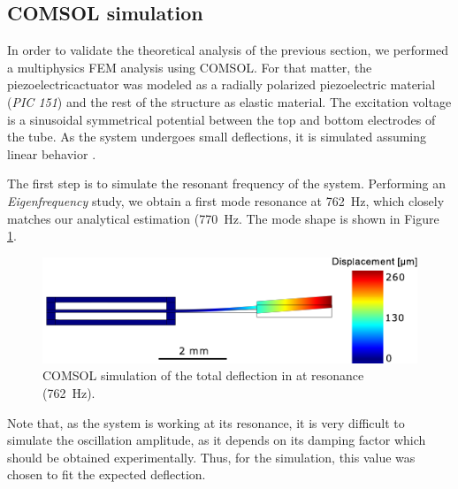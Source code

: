 \subsection{COMSOL simulation}
In order to validate the theoretical analysis of the previous section, we performed a multiphysics FEM analysis using COMSOL. For that matter, the piezoelectricactuator was modeled as a radially polarized piezoelectric material (\textit{PIC 151}) and the rest of the structure as elastic material. The excitation voltage is a sinusoidal symmetrical potential between the top and bottom electrodes of the tube. As the system undergoes small deflections, it is simulated assuming linear behavior \cite{Fertis2006}.

The first step is to simulate the resonant frequency of the system. Performing an \textit{Eigenfrequency} study, we obtain a first mode resonance at \SI{762}{\hertz}, which closely matches our analytical estimation (\SI{770}{\hertz}. The mode shape is shown in Figure \ref{fig:defle}.

\begin{figure}[h!]\centering
      \includegraphics[width=10 cm]{figures/30_DesignSimulation/Mechanical/deflection.pdf}
      \caption{COMSOL simulation of the total deflection in at resonance (\SI{762}{\hertz}).}
      \label{fig:defle}
\end{figure}

Note that, as the system is working at its resonance, it is very difficult to simulate the oscillation amplitude, as it depends on its damping factor which should be obtained experimentally. Thus, for the simulation, this value was chosen to fit the expected deflection. 


